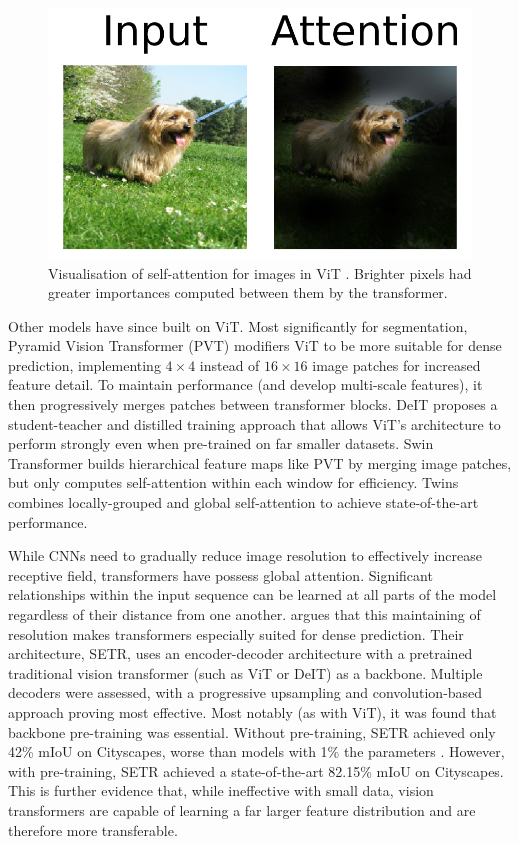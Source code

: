 \documentclass[a4paper,12pt]{report}
\begin{document}
    \begin{figure}[h]
        \centering
        \includegraphics[scale=0.5]{res/vit-attention.png}
        \caption{Visualisation of self-attention for images in ViT \cite{dosovitskiy_image_2021}. Brighter pixels had greater importances computed between them by the transformer.}
        \label{fig:vit_attention}
    \end{figure}
    
    Other models have since built on ViT. Most significantly for segmentation, Pyramid Vision Transformer (PVT) \cite{wang_pyramid_2021} modifiers ViT to be more suitable for dense prediction, implementing $4 \times 4$ instead of $16 \times 16$ image patches for increased feature detail. To maintain performance (and develop multi-scale features), it then progressively merges patches between transformer blocks. DeIT \cite{touvron_training_2021} proposes a student-teacher and distilled training approach that allows ViT’s architecture to perform strongly even when pre-trained on far smaller datasets. Swin Transformer \cite{liu_swin_2021} builds hierarchical feature maps like PVT by merging image patches, but only computes self-attention within each window for efficiency. Twins \cite{chu_twins_2021} combines locally-grouped and global self-attention to achieve state-of-the-art performance.
    
    While CNNs need to gradually reduce image resolution to effectively increase receptive field, transformers have possess global attention. Significant relationships within the input sequence can be learned at all parts of the model regardless of their distance from one another. \cite{zheng_rethinking_2021} argues that this maintaining of resolution makes transformers especially suited for dense prediction. Their architecture, SETR, uses an encoder-decoder architecture with a pretrained traditional vision transformer (such as ViT or DeIT) as a backbone. Multiple decoders were assessed, with a progressive upsampling and convolution-based approach proving most effective. Most notably (as with ViT), it was found that backbone pre-training was essential. Without pre-training, SETR achieved only 42\% mIoU on Cityscapes, worse than models with 1\% the parameters \cite{paszke_enet_2016}. However, with pre-training, SETR achieved a state-of-the-art 82.15\% mIoU on Cityscapes. This is further evidence that, while ineffective with small data, vision transformers are capable of learning a far larger feature distribution and are therefore more transferable.
    
\end{document}
